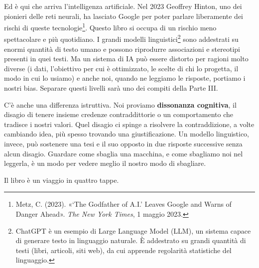 Ed è qui che arriva l'intelligenza artificiale. Nel 2023 Geoffrey Hinton, uno dei pionieri delle reti neurali, ha lasciato Google per poter parlare liberamente dei rischi di queste tecnologie\footnote{Metz, C. (2023). «‘The Godfather of A.I.’ Leaves Google and Warns of Danger Ahead». \textit{The New York Times}, 1 maggio 2023.}. Questo libro si occupa di un rischio meno spettacolare e più quotidiano. I grandi modelli linguistici\footnote{ChatGPT è un esempio di Large Language Model (LLM), un sistema capace di generare testo in linguaggio naturale. È addestrato su grandi quantità di testi (libri, articoli, siti web), da cui apprende regolarità statistiche del linguaggio.} sono addestrati su enormi quantità di testo umano e possono riprodurre associazioni e stereotipi presenti in quei testi. Ma un sistema di IA può essere distorto per ragioni molto diverse (i dati, l'obiettivo per cui è ottimizzato, le scelte di chi lo progetta, il modo in cui lo usiamo) e anche noi, quando ne leggiamo le risposte, portiamo i nostri bias. Separare questi livelli sarà uno dei compiti della Parte III.

C'è anche una differenza istruttiva. Noi proviamo \textbf{dissonanza cognitiva}, il disagio di tenere insieme credenze contraddittorie o un comportamento che tradisce i nostri valori. Quel disagio ci spinge a risolvere la contraddizione, a volte cambiando idea, più spesso trovando una giustificazione. Un modello linguistico, invece, può sostenere una tesi e il suo opposto in due risposte successive senza alcun disagio. Guardare come sbaglia una macchina, e come sbagliamo noi nel leggerla, è un modo per vedere meglio il nostro modo di sbagliare.

\vspace{1em}

Il libro è un viaggio in quattro tappe.

